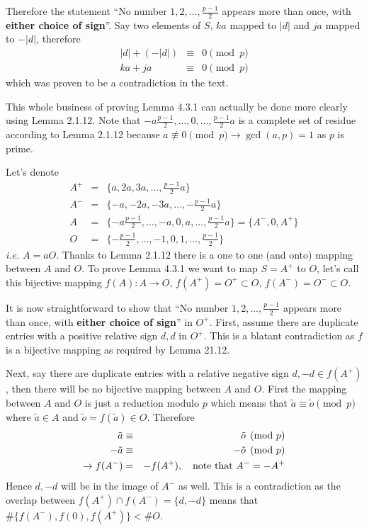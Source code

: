 \documentclass[aps,preprint,preprintnumbers,nofootinbib,showpacs,prd]{revtex4-1}
\newcommand{\ie}{{\it i.e.} }
\newcommand{\nbea}{\begin{eqnarray*}}
\newcommand{\neea}{\end{eqnarray*}}
\begin{document}
Therefore the statement ``No number $1, 2, \dots , \frac{p-1}{2}$ appears more than once, with {\bf either choice of sign}''. Say two elements of $S$, $ka$ mapped to $|d|$ and $ja$ mapped to $-|d|$, therefore
%
\nbea
|d| + (-|d|) & \equiv & 0 \pmod{p} \\
ka + ja & \equiv & 0 \pmod{p}
\neea
%
which was proven to be a contradiction in the text.

This whole business of proving Lemma 4.3.1 can actually be done more clearly using Lemma 2.1.12. Note that $-a\frac{p-1}{2}, \dots, 0, \dots, \frac{p-1}{2}a$ is a complete set of residue according to Lemma 2.1.12 because $a \not\equiv 0 \pmod{p} \to \gcd(a,p) = 1$ as $p$ is prime.

Let's denote
%
\nbea
A^+ & = & \{a, 2a, 3a, \dots, \frac{p-1}{2}a\} \\
A^- & = & \{-a, -2a, -3a, \dots, -\frac{p-1}{2}a\} \\
A & = & \{-a\frac{p-1}{2}, \dots, -a, 0, a, \dots, \frac{p-1}{2}a\}  = \{A^-, 0, A^+\}\\
O & = & \{-\frac{p-1}{2}, \dots, -1, 0, 1, \dots, \frac{p-1}{2}\}
\neea
%
\ie $A = aO$. Thanks to Lemma 2.1.12 there is a one to one (and onto) mapping between $A$ and $O$. To prove Lemma 4.3.1 we want to map $S = A^+$ to $O$, let's call this bijective mapping $f(A): A \to O$, $f(A^+) = O^+ \subset O$, $f(A^-) = O^- \subset O$.

It is now straightforward to show that ``No number $1, 2, \dots , \frac{p-1}{2}$ appears more than once, with {\bf either choice of sign}'' in  $O^+$. First, assume there are duplicate entries with a positive relative sign $d, d$ in $O^+$. This is a blatant contradiction as $f$ is a bijective mapping as required by Lemma 21.12. 

Next, say there are duplicate entries with a relative negative sign $d, -d \in f(A^+)$, then there will be no bijective mapping between $A$ and $O$. First the mapping between $A$ and $O$ is just a reduction modulo $p$ which means that $\tilde a \equiv \tilde o \pmod{p}$ where $\tilde a \in A$ and $\tilde o = f(\tilde a) \in O$. Therefore
%
\nbea
\tilde a & \equiv & \tilde o \pmod{p} \\
-\tilde a & \equiv & -\tilde o \pmod{p} \\
\to f(A^-) & = & - f(A^+), ~~~{\rm note~that~} A^- = -A^+
\neea
%
Hence $d, -d$ will be in the image of $A^-$ as well. This is a contradiction as the overlap between $f(A^+) \cap f(A^-) = \{d, -d\}$ means that $\#\{f(A^-), f(0), f(A^+)\} < \#O$.
\end{document}

